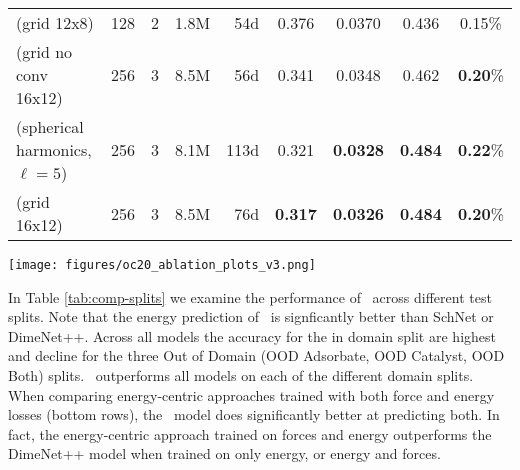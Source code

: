 \begin{table*}[t]
{\begin{tabular}{lrrrrcccc}
        {\model{} (grid 12x8)}  & 128 & 2 & 1.8M & 54d & 0.376 & 0.0370 & 0.436 &  0.15\%   \\
        {\model{} (grid no conv 16x12)}  & 256 & 3 & 8.5M & 56d & 0.341 & 0.0348 &  0.462  & \textbf{0.20}\%    \\
        {\model{} (spherical harmonics, $\ell = 5$)} & 256 & 3 & 8.1M & 113d & 0.321 & \textbf{0.0328} & \textbf{0.484} & \textbf{0.22}\%    \\
        {\model{} (grid 16x12)}  & 256 & 3 & 8.5M & 76d & \textbf{0.317} & \textbf{0.0326} & \textbf{0.484} & \textbf{0.20}\%    \\
      \bottomrule
    \end{tabular}}
    \caption{Ablation studies for \model{}~model variations trained for 560k steps (32-48 batch size, 0.2 epochs) with 16 Volta 32 GB GPUs. Training time is in GPU days and the validation set is a 30k random sample of the OC20 ID Validation set.}
    \label{tab:comp-ablation}
    \vspace{-0.35cm}
\end{table*}
 
\begin{figure*}[t]
    \centering
    \texttt{[image: figures/oc20\_ablation\_plots\_v3.png]}
    \caption{Performance of SpinConv ablations on OC20 Val ID $30k$ (Table~\ref{tab:comp-ablation}).
    All models trained for $560k$ steps and plotted against wall-clock training time.
    Note force-centric models and grid-based approaches converge more quickly than energy-centric models
    and those using spherical harmonics.}
    \label{fig:ablationplots}
\end{figure*}






In Table \ref{tab:comp-splits} we examine the performance of \model~across different test splits. Note that the energy prediction of \model~is signficantly better than SchNet or DimeNet++. Across all models the accuracy for the in domain split are highest and decline for the three Out of Domain (OOD Adsorbate, OOD Catalyst, OOD Both) splits. \model~outperforms all models on each of the different domain splits. When comparing energy-centric approaches trained with both force and energy losses (bottom rows), the \model~model does significantly better at predicting both. In fact, the energy-centric approach trained on forces and energy outperforms the DimeNet++ \cite{klicpera_dimenetpp_2020} model when trained on only energy, or energy and forces.

